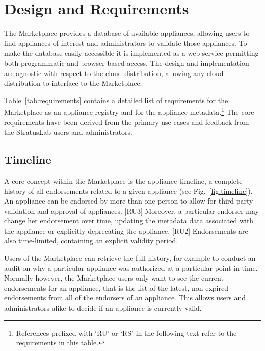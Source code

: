 \section{Design and Requirements}
\label{sec:design}

The Marketplace provides a database of available appliances, allowing
users to find appliances of interest and administrators to validate
those appliances.  To make the database easily accessible it is
implemented as a web service permitting both programmatic and
browser-based access.  The design and implementation are agnostic with
respect to the cloud distribution, allowing any cloud distribution to
interface to the Marketplace\@.

Table~\ref{tab:requirements} contains a detailed list of requirements
for the Marketplace as an appliance registry and for the appliance
metadata.\footnote{References prefixed with `RU' or `RS' in the
  following text refer to the requirements in this table.}  The core
requirements have been derived from the primary use cases and feedback
from the StratusLab users and administrators.

\subsection{Timeline}

A core concept within the Marketplace is the appliance timeline, a
complete history of all endorsements related to a given appliance (see
Fig.~\ref{fig:timeline}).  An appliance can be endorsed by more than
one person to allow for third party validation and approval of
appliances. [RU3] Moreover, a particular endorser may change her
endorsement over time, updating the metadata data associated with the
appliance or explicitly deprecating the appliance. [RU2] Endorsements
are also time-limited, containing an explicit validity period.

Users of the Marketplace can retrieve the full history, for example to
conduct an audit on why a particular appliance was authorized at a
particular point in time.  Normally however, the Marketplace users
only want to see the current endorsements for an appliance, that is
the list of the latest, non-expired endorsements from all of the
endorsers of an appliance.  This allows users and administrators alike
to decide if an appliance is currently valid.

